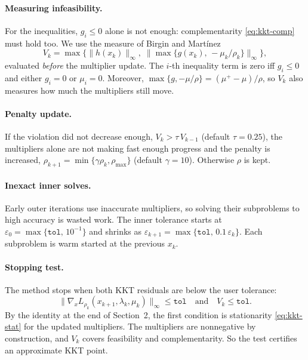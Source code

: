 \documentclass[11pt,a4paper]{article}
\newcommand{\norm}[1]{\lVert #1\rVert}
\begin{document}
\paragraph{Measuring infeasibility.}
For the inequalities, $g_i\le 0$ alone is not enough: complementarity
\eqref{eq:kkt-comp} must hold too. We use the measure of Birgin and
Mart\'inez~\cite{birgin2014}
\begin{equation}\label{eq:violation}
  V_k = \max\Big\{ \norm{h(x_k)}_\infty,\;
                   \norm{\max\{g(x_k),\,-\mu_k/\rho_k\}}_\infty \Big\},
\end{equation}
evaluated \emph{before} the multiplier update. The $i$-th inequality term is zero
iff $g_i\le 0$ and either $g_i=0$ or $\mu_i=0$. Moreover,
$\max\{g,-\mu/\rho\} = (\mu^+-\mu)/\rho$, so $V_k$ also measures how much the
multipliers still move.

\paragraph{Penalty update.}
If the violation did not decrease enough,
$V_k > \tau\, V_{k-1}$ (default $\tau=0.25$), the multipliers alone are not
making fast enough progress and the penalty is increased,
$\rho_{k+1}=\min\{\gamma\rho_k,\rho_{\max}\}$ (default $\gamma=10$).
Otherwise $\rho$ is kept.

\paragraph{Inexact inner solves.}
Early outer iterations use inaccurate multipliers, so solving their subproblems
to high accuracy is wasted work. The inner tolerance starts at
$\varepsilon_0 = \max\{\texttt{tol},\,10^{-1}\}$ and shrinks as
$\varepsilon_{k+1}=\max\{\texttt{tol},\,0.1\,\varepsilon_k\}$. Each subproblem is warm
started at the previous $x_k$.

\paragraph{Stopping test.}
The method stops when both KKT residuals are below the user tolerance:
\[
  \norm{\nabla_x L_{\rho_k}(x_{k+1},\lambda_k,\mu_k)}_\infty \le \texttt{tol}
  \quad\text{and}\quad V_k \le \texttt{tol}.
\]
By the identity at the end of Section~2, the first condition is stationarity
\eqref{eq:kkt-stat} for the updated multipliers. The multipliers are
nonnegative by construction, and $V_k$ covers feasibility and complementarity.
So the test certifies an approximate KKT point.
\end{document}
